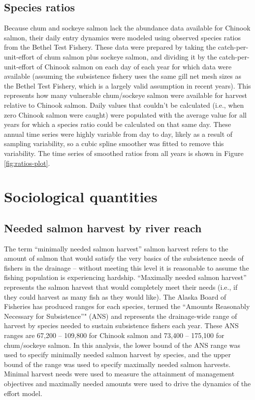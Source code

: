 \documentclass[12pt,]{book}
\theoremstyle{definition}
\theoremstyle{definition}
\theoremstyle{definition}
\theoremstyle{remark}
\begin{document}
\subsection{Species ratios}\label{species-ratios}

\noindent
Because chum and sockeye salmon lack the abundance data available for
Chinook salmon, their daily entry dynamics were modeled using observed
species ratios from the Bethel Test Fishery. These data were prepared by
taking the catch-per-unit-effort of chum salmon plus sockeye salmon, and
dividing it by the catch-per-unit-effort of Chinook salmon on each day
of each year for which data were available (assuming the subsistence
fishery uses the same gill net mesh sizes as the Bethel Test Fishery,
which is a largely valid assumption in recent years). This represents
how many vulnerable chum/sockeye salmon were available for harvest
relative to Chinook salmon. Daily values that couldn't be calculated
(i.e., when zero Chinook salmon were caught) were populated with the
average value for all years for which a species ratio could be
calculated on that same day. These annual time series were highly
variable from day to day, likely as a result of sampling variability, so
a cubic spline smoother was fitted to remove this variability. The time
series of smoothed ratios from all years is shown in Figure
\ref{fig:ratios-plot}.

\section{Sociological quantities}\label{sociological-quantities}

\subsection{Needed salmon harvest by river
reach}\label{needed-salmon-harvest-by-river-reach}

\noindent
The term ``minimally needed salmon harvest'' salmon harvest refers to
the amount of salmon that would satisfy the very basics of the
subsistence needs of fishers in the drainage -- without meeting this
level it is reasonable to assume the fishing population is experiencing
hardship. ``Maximally needed salmon harvest'' represents the salmon
harvest that would completely meet their needs (i.e., if they could
harvest as many fish as they would like). The Alaska Board of Fisheries
has produced ranges for each species, termed the ``Amounts Reasonably
Necessary for Subsistence''" (ANS) and represents the drainage-wide
range of harvest by species needed to sustain subsistence fishers each
year. These ANS ranges are 67,200 -- 109,800 for Chinook salmon and
73,400 -- 175,100 for chum/sockeye salmon. In this analysis, the lower
bound of the ANS range was used to specify minimally needed salmon
harvest by species, and the upper bound of the range was used to specify
maximally needed salmon harvests. Minimal harvest needs were used to
measure the attainment of management objectives and maximally needed
amounts were used to drive the dynamics of the effort model.
\end{document}
